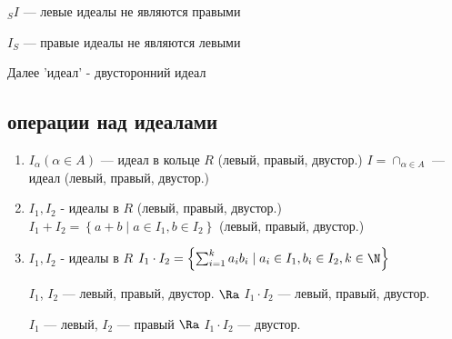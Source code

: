 ${}_SI$ --- левые идеалы не являются правыми

$I_S$ --- правые идеалы не являются левыми

\begin{Rem}
	Далее 'идеал' - двусторонний идеал
\end{Rem}

\subsection{операции над идеалами}

\begin{enumerate}
	\item $I_\alpha (\alpha \in A)$ --- идеал в кольце $R$ (левый, правый, двустор.)
	$I = \cap_{\alpha \in A}$ --- идеал (левый, правый, двустор.)
	\item $I_1, I_2$ - идеалы в $R$ (левый, правый, двустор.)
	$I_1 + I_2 = \left\lbrace  a + b \mid a \in I_1, b \in I_2 \right\rbrace$ (левый, правый, двустор.)
	\item $I_1, I_2$ - идеалы в $R$
	$I_1 \cdot I_2 = \left\lbrace  \sum_{i=1}^k a_i b_i \mid a_i \in I_1, b_i \in I_2, k \in \N \right\rbrace$
	
	$I_1$, $I_2$ --- левый, правый, двустор.  $\Ra$ $I_1 \cdot I_2$ --- левый, правый, двустор.
	
	$I_1$ --- левый, $I_2$ --- правый $\Ra$ $I_1 \cdot I_2$ --- двустор.
\end{enumerate}

